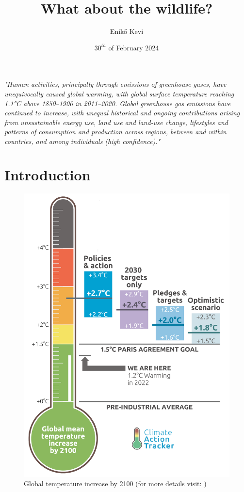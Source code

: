 \documentclass[12pt]{article}
\title{What about the wildlife?}
\author{Enik\H{o} Kevi}
\date{$30^{th}$ of February 2024}
\begin{document}
\maketitle

\textit{"Human activities, principally through emissions of greenhouse gases, have unequivocally caused global warming, with global surface temperature reaching 1.1°C above 1850–1900 in 2011–2020. Global greenhouse gas emissions have continued to increase, with unequal historical and ongoing contributions arising from unsustainable energy use, land use and land-use change, lifestyles and patterns of consumption and production across regions, between and within countries, and among individuals (high confidence)."} \cite{IPCC-Headline}

\section{Introduction}

\begin{figure}
    \vspace{-18pt}
    \centering
    \includegraphics[width=0.78\linewidth]{Figures/cat.png}
    \caption{Global temperature increase by 2100 (for more details visit: \cite{CAT})}
    \label{fig:cat}
\end{figure}
\end{document}
